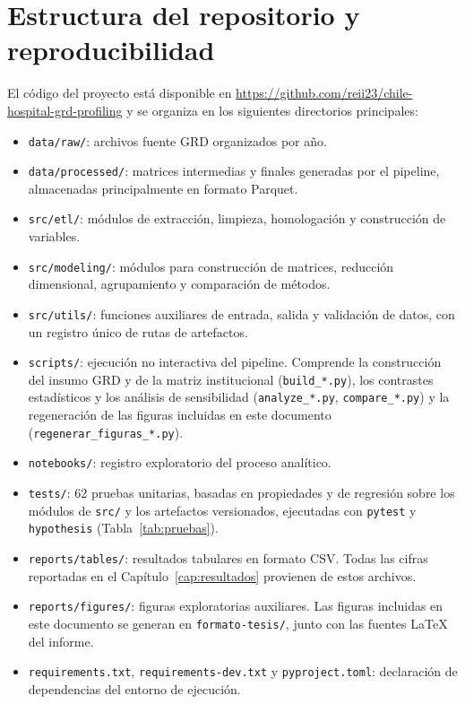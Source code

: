 \section{Estructura del repositorio y reproducibilidad}
\label{anexo:repositorio}

El código del proyecto está disponible en
\url{https://github.com/reii23/chile-hospital-grd-profiling} y se organiza en
los siguientes directorios principales:

\begin{itemize}
  \item \texttt{data/raw/}: archivos fuente GRD organizados por año.

  \item \texttt{data/processed/}: matrices intermedias y finales generadas por
  el pipeline, almacenadas principalmente en formato Parquet.

  \item \texttt{src/etl/}: módulos de extracción, limpieza, homologación y
  construcción de variables.

  \item \texttt{src/modeling/}: módulos para construcción de matrices,
  reducción dimensional, agrupamiento y comparación de métodos.

  \item \texttt{src/utils/}: funciones auxiliares de entrada, salida y
  validación de datos, con un registro único de rutas de artefactos.

  \item \texttt{scripts/}: ejecución no interactiva del pipeline. Comprende la
  construcción del insumo GRD y de la matriz institucional
  (\texttt{build\_*.py}), los contrastes estadísticos y los análisis de
  sensibilidad (\texttt{analyze\_*.py}, \texttt{compare\_*.py}) y la
  regeneración de las figuras incluidas en este documento
  (\texttt{regenerar\_figuras\_*.py}).

  \item \texttt{notebooks/}: registro exploratorio del proceso analítico.

  \item \texttt{tests/}: 62 pruebas unitarias, basadas en propiedades y de
  regresión sobre los módulos de \texttt{src/} y los artefactos versionados,
  ejecutadas con \texttt{pytest} y \texttt{hypothesis}
  (Tabla~\ref{tab:pruebas}).

  \item \texttt{reports/tables/}: resultados tabulares en formato CSV. Todas
  las cifras reportadas en el Capítulo~\ref{cap:resultados} provienen de estos
  archivos.

  \item \texttt{reports/figures/}: figuras exploratorias auxiliares. Las
  figuras incluidas en este documento se generan en
  \texttt{formato-tesis/}, junto con las fuentes \LaTeX{} del informe.

  \item \texttt{requirements.txt}, \texttt{requirements-dev.txt} y
  \texttt{pyproject.toml}: declaración de dependencias del entorno de ejecución.
\end{itemize}

